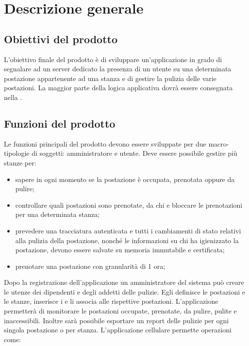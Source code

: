 \section{Descrizione generale}

\subsection{Obiettivi del prodotto}
L'obiettivo finale del prodotto è di sviluppare un’applicazione in grado di segnalare ad un server dedicato la presenza di un utente su una determinata postazione appartenente ad una stanza e di gestire la pulizia delle varie postazioni.
La maggior parte della logica applicativa dovrà essere consegnata nella  .

\subsection{Funzioni del prodotto}
Le funzioni principali del prodotto devono essere sviluppate per due macro-tipologie di soggetti: amministratore e utente.
Deve essere possibile gestire più stanze per:
\begin{itemize}
	\item sapere in ogni momento se la postazione è occupata, prenotata oppure da pulire; \\
	\item controllare quali postazioni sono prenotate, da chi e bloccare le prenotazioni per una determinata stanza; \\
	\item prevedere una tracciatura autenticata e tutti i cambiamenti di stato relativi alla pulizia della postazione, nonché le informazioni su chi ha igienizzato la postazione, devono essere salvate su memoria immutabile e certificata; \\
	\item prenotare una postazione con granularità di 1 ora; \\
\end{itemize}
Dopo la registrazione dell’applicazione un amministratore del sistema può creare le utenze dei dipendenti e degli addetti delle pulizie. Egli definisce le postazioni e le stanze, inserisce i  e li associa alle rispettive postazioni.
L'applicazione permetterà di monitorare le postazioni occupate, prenotate, da pulire, pulite e inaccessibili. Inoltre sarà possibile esportare un report delle pulizie per ogni singola postazione o per stanza.
L’applicazione cellulare permette operazioni come:
